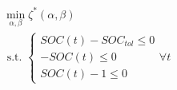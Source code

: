 \begin{equation}
\begin{split}
	&\min_{\alpha,\beta} \zeta^*(\alpha, \beta) \\
	&\text{ s.t. }
	\begin{cases}
		SOC(t) - SOC_{tol} \leq 0\\
		-SOC(t) \leq 0\\
		SOC(t) - 1 \leq 0
	\end{cases}
	\forall t
\end{split}
\label{ch2:equ:cost-weights}
\end{equation}
